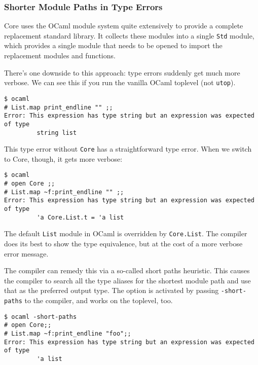 \hypertarget{shorter-module-paths-in-type-errors}{%
\subsubsection{Shorter Module Paths in Type
Errors}\label{shorter-module-paths-in-type-errors}}

Core uses the OCaml module system quite extensively to provide a
complete replacement standard library. It collects these modules into a
single \passthrough{\lstinline!Std!} module, which provides a single
module that needs to be opened to import the replacement modules and
functions. 

There's one downside to this approach: type errors suddenly get much
more verbose. We can see this if you run the vanilla OCaml toplevel (not
\passthrough{\lstinline!utop!}).

\begin{lstlisting}
$ ocaml
# List.map print_endline "" ;;
Error: This expression has type string but an expression was expected of type
         string list
\end{lstlisting}

This type error without \passthrough{\lstinline!Core!} has a
straightforward type error. When we switch to Core, though, it gets more
verbose:

\begin{lstlisting}
$ ocaml
# open Core ;;
# List.map ~f:print_endline "" ;;
Error: This expression has type string but an expression was expected of type
         'a Core.List.t = 'a list
\end{lstlisting}

The default \passthrough{\lstinline!List!} module in OCaml is overridden
by \passthrough{\lstinline!Core.List!}. The compiler does its best to
show the type equivalence, but at the cost of a more verbose error
message.

The compiler can remedy this via a so-called short paths heuristic. This
causes the compiler to search all the type aliases for the shortest
module path and use that as the preferred output type. The option is
activated by passing \passthrough{\lstinline!-short-paths!} to the
compiler, and works on the toplevel, too.

\begin{lstlisting}
$ ocaml -short-paths
# open Core;;
# List.map ~f:print_endline "foo";;
Error: This expression has type string but an expression was expected of type
         'a list
\end{lstlisting}

